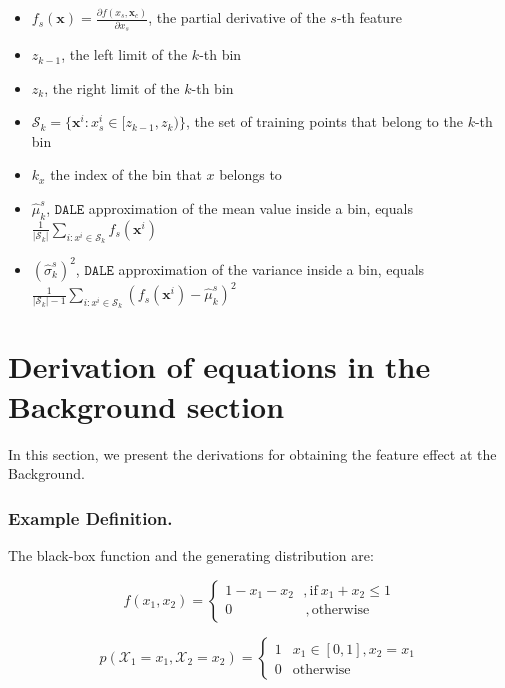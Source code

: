 \documentclass[wcp]{jmlr}
\newcommand{\xc}{\mathbf{x}_c}
\newcommand{\xb}{\mathbf{x}}
\begin{document}
\begin{itemize}
\item \( f_s(\xb) = \frac{\partial f(x_s, \xc)}{\partial x_s} \), the partial derivative of the \( s \)-th feature
\item \( z_{k-1}\), the left limit of the \( k\)-th bin
\item \( z_k\), the right limit of the \( k \)-th bin
\item \( \mathcal{S}_k = \{ \xb^i : x^i_s \in [z_{k-1}, z_k) \}\), the set of training points that belong to the \( k\)-th bin
\item \( k_x \) the index of the bin that \( x \) belongs to
\item \( \hat{\mu}_k^s\), \(\mathtt{DALE}\) approximation of the mean value inside a bin, equals \( \frac{1}{|\mathcal{S}_k|} \sum_{i: x^i\in \mathcal{S}_k} f_s(\xb^i) \)
\item \( (\hat{\sigma}_k^s)^2\), \(\mathtt{DALE}\) approximation of the variance inside a bin, equals \( \frac{1}{|\mathcal{S}_k|-1} \sum_{i: x^i\in \mathcal{S}_k} (f_s(\xb^i) - \hat{\mu}_k^s)^2 \)

\end{itemize}

\section{Derivation of equations in the Background section}

In this section, we present the derivations for obtaining the feature
effect at the Background.


\subsubsection*{Example Definition.}The black-box function and the
generating distribution are:

\begin{equation}
  \label{eq:black-box}
  f(x_1, x_2) =
  \begin{cases}
    1 - x_1 - x_2 \: \: \:  ,\text{if} \: x_1 + x_2  \leq 1 \\
    0 \quad \quad \quad \quad \quad \:, \text{otherwise}
  \end{cases}
\end{equation}

\begin{equation}
  \label{eq:generative}
  p(\mathcal{X}_1 = x_1, \mathcal{X}_2=x_2) =
  \begin{cases}
    1 & x_1 \in [0,1], x_2=x_1 \\
    0 & \text{otherwise}
  \end{cases}
\end{equation}
\end{document}
